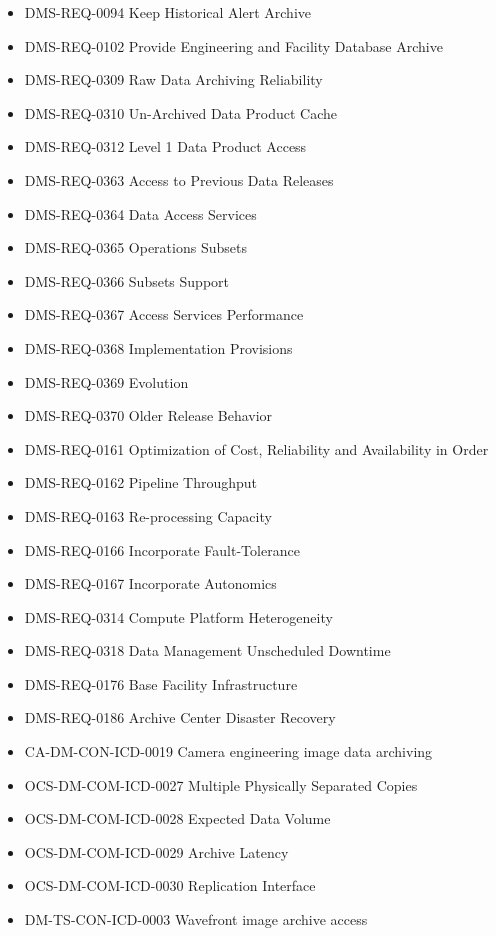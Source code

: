 \begin{itemize}
\item DMS-REQ-0094 Keep Historical Alert Archive
\item DMS-REQ-0102 Provide Engineering and Facility Database Archive
\item DMS-REQ-0309 Raw Data Archiving Reliability
\item DMS-REQ-0310 Un-Archived Data Product Cache
\item DMS-REQ-0312 Level 1 Data Product Access
\item DMS-REQ-0363 Access to Previous Data Releases
\item DMS-REQ-0364 Data Access Services
\item DMS-REQ-0365 Operations Subsets
\item DMS-REQ-0366 Subsets Support
\item DMS-REQ-0367 Access Services Performance
\item DMS-REQ-0368 Implementation Provisions
\item DMS-REQ-0369 Evolution
\item DMS-REQ-0370 Older Release Behavior
\item DMS-REQ-0161 Optimization of Cost, Reliability and Availability in Order
\item DMS-REQ-0162 Pipeline Throughput
\item DMS-REQ-0163 Re-processing Capacity
\item DMS-REQ-0166 Incorporate Fault-Tolerance
\item DMS-REQ-0167 Incorporate Autonomics
\item DMS-REQ-0314 Compute Platform Heterogeneity
\item DMS-REQ-0318 Data Management Unscheduled Downtime
\item DMS-REQ-0176 Base Facility Infrastructure
\item DMS-REQ-0186 Archive Center Disaster Recovery
\item CA-DM-CON-ICD-0019 Camera engineering image data archiving
\item OCS-DM-COM-ICD-0027 Multiple Physically Separated Copies
\item OCS-DM-COM-ICD-0028 Expected Data Volume
\item OCS-DM-COM-ICD-0029 Archive Latency
\item OCS-DM-COM-ICD-0030 Replication Interface
\item DM-TS-CON-ICD-0003 Wavefront image archive access
\end{itemize}
